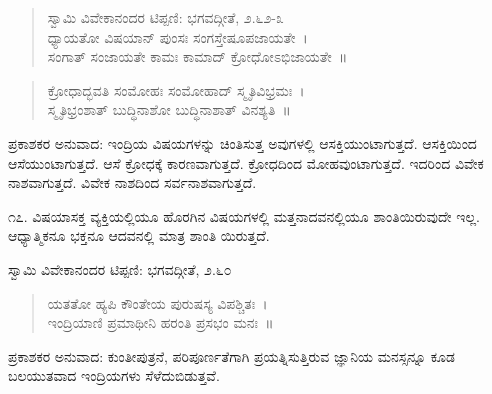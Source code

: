 \begin{verse}
ಸ್ವಾಮಿ ವಿವೇಕಾನಂದರ ಟಿಪ್ಪಣಿ: ಭಗವದ್ಗೀತೆ, ೨.೬೨-೩\\ಧ್ಯಾಯತೋ ವಿಷಯಾನ್ ಪುಂಸಃ ಸಂಗಸ್ತೇಷೂಪಜಾಯತೇ~।\\ಸಂಗಾತ್ ಸಂಜಾಯತೇ ಕಾಮಃ ಕಾಮಾದ್ ಕ್ರೋಧೋಽಭಿಜಾಯತೇ~॥
\end{verse}

\begin{verse}
ಕ್ರೋಧಾದ್ಭವತಿ ಸಂಮೋಹಃ ಸಂಮೋಹಾದ್ ಸ್ಮೃತಿವಿಭ್ರಮಃ~।\\ಸ್ಮೃತಿಭ್ರಂಶಾತ್ ಬುದ್ಧಿನಾಶೋ ಬುದ್ಧಿನಾಶಾತ್ ವಿನಶ್ಯತಿ~॥
\end{verse}

ಪ್ರಕಾಶಕರ ಅನುವಾದ: ಇಂದ್ರಿಯ ವಿಷಯಗಳನ್ನು ಚಿಂತಿಸುತ್ತ ಅವುಗಳಲ್ಲಿ ಆಸಕ್ತಿಯುಂಟಾಗುತ್ತದೆ. ಆಸಕ್ತಿಯಿಂದ ಆಸೆಯುಂಟಾಗುತ್ತದೆ. ಆಸೆ ಕ್ರೋಧಕ್ಕೆ ಕಾರಣವಾಗುತ್ತದೆ. ಕ್ರೋಧದಿಂದ ಮೋಹವುಂಟಾಗುತ್ತದೆ. ಇದರಿಂದ ವಿವೇಕ ನಾಶವಾಗುತ್ತದೆ. ವಿವೇಕ ನಾಶದಿಂದ ಸರ್ವನಾಶವಾಗುತ್ತದೆ.

೧೭. ವಿಷಯಾಸಕ್ತ ವ್ಯಕ್ತಿಯಲ್ಲಿಯೂ ಹೊರಗಿನ ವಿಷಯಗಳಲ್ಲಿ ಮತ್ತನಾದವನಲ್ಲಿಯೂ ಶಾಂತಿಯಿರುವುದೇ ಇಲ್ಲ. ಆಧ್ಯಾತ್ಮಿಕನೂ ಭಕ್ತನೂ ಆದವನಲ್ಲಿ ಮಾತ್ರ ಶಾಂತಿ ಯಿರುತ್ತದೆ. 

\begin{myquote}
ಸ್ವಾಮಿ ವಿವೇಕಾನಂದರ ಟಿಪ್ಪಣಿ: ಭಗವದ್ಗೀತೆ, ೨.೬೦
\end{myquote}

\begin{verse}
ಯತತೋ ಹ್ಯಪಿ ಕೌಂತೇಯ ಪುರುಷಸ್ಯ ವಿಪಶ್ಚಿತಃ~।\\ಇಂದ್ರಿಯಾಣಿ ಪ್ರಮಾಥೀನಿ ಹರಂತಿ ಪ್ರಸಭಂ ಮನಃ~॥
\end{verse}

ಪ್ರಕಾಶಕರ ಅನುವಾದ: ಕುಂತೀಪುತ್ರನೆ, ಪರಿಪೂರ್ಣತೆಗಾಗಿ ಪ್ರಯತ್ನಿಸುತ್ತಿರುವ ಜ್ಞಾನಿಯ ಮನಸ್ಸನ್ನೂ ಕೂಡ ಬಲಯುತವಾದ ಇಂದ್ರಿಯಗಳು ಸೆಳೆದುಬಿಡುತ್ತವೆ.

